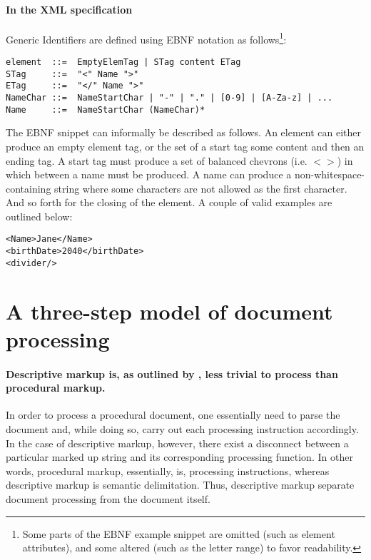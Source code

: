 \documentclass{scrreprt}
\begin{document}
\paragraph{In the XML specification}\citep{xmlRecommendation2008} Generic Identifiers are defined using EBNF notation as follows\footnote{ Some parts of the EBNF example snippet are omitted (such as element attributes), and some altered (such as the letter range) to favor readability.}:

\begin{lstlisting}
element  ::=  EmptyElemTag | STag content ETag
STag     ::=  "<" Name ">"
ETag     ::=  "</" Name ">"
NameChar ::=  NameStartChar | "-" | "." | [0-9] | [A-Za-z] | ...
Name     ::=  NameStartChar (NameChar)*
\end{lstlisting}

The EBNF snippet can informally be described as follows. An element can either produce an empty element tag, or the set of a start tag some content and then an ending tag. A start tag must produce a set of balanced chevrons (i.e. $<>$) in which between a name must be produced. A name can produce a non-whitespace-containing string where some characters are not allowed as the first character. And so forth for the closing of the element. A couple of valid examples are outlined below:

\begin{lstlisting}
<Name>Jane</Name>
<birthDate>2040</birthDate>
<divider/>
\end{lstlisting}


















%
%
%
%
%
%

\section{A three-step model of document processing}
\label{sec:three-step-model}
\paragraph{Descriptive markup is, as outlined by \citet{goldfarb}, less trivial to process than procedural markup.} In order to process a procedural document, one essentially need to parse the document and, while doing so, carry out each processing instruction accordingly. In the case of descriptive markup, however, there exist a disconnect between a particular marked up string and its corresponding processing function. In other words, procedural markup, essentially, is, processing instructions, whereas descriptive markup is semantic delimitation. Thus, descriptive markup separate document processing from the document itself.
\end{document}
